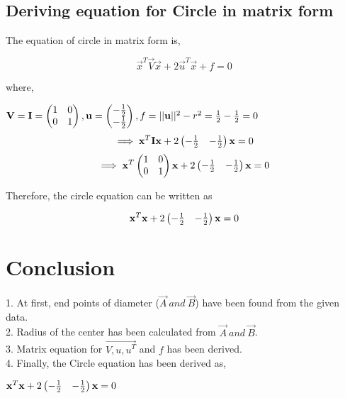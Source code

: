 \documentclass[journal,10pt,twocolumn]{article}
\begin{document}
\subsection{Deriving equation for Circle in matrix form}
\vspace{0.2cm}
\begin{flushleft}
The equation of circle in matrix form is,\\
\vspace{0.25cm}
\end{flushleft}
\vspace{0.25cm}
\begin{equation}
 \vec{x}^T \vec{V} \vec{x} + 2 \vec{u}^T \vec{x} + f = 0
\end{equation}
\endcenter

\begin{flushleft}
where,\\
\end{flushleft}
\center
$\mathbf{V} = \mathbf{I}= \begin{pmatrix} 1 & 0\\ 0 & 1\end{pmatrix}, \mathbf{u} = \begin{pmatrix}-\frac{1}{2} \\ -\frac{1}{2}\end{pmatrix}, f = ||\mathbf{u}||^2 - r^2 =\frac{1}{2}-\frac{1}{2}=0$\\
\endcenter
\begin{equation}
\implies \mathbf{x}^T\mathbf{I}\mathbf{x}  + 2  \begin{pmatrix}-\frac{1}{2}&-\frac{1}{2}\end{pmatrix} \mathbf{x} = 0
\end{equation}
\begin{equation}
   \implies  \mathbf{x}^T\begin{pmatrix}1&0\\0&1\end{pmatrix} \mathbf{x}  + 2  \begin{pmatrix}-\frac{1}{2}&-\frac{1}{2}\end{pmatrix} \mathbf{x}= 0 
\end{equation}
 \begin{flushleft}
\vspace{0.23cm}
Therefore, the circle equation can be written as
\end{flushleft}
\begin{equation}
    \mathbf{x}^T \mathbf{x} + 2 \begin{pmatrix}-\frac{1}{2}&-\frac{1}{2}\end{pmatrix} \mathbf{x}= 0
\end{equation}
\endcenter


\section{Conclusion}
\begin{flushleft}
1. At first, end points of diameter ($\vec{A}\ and\ \vec{B}$) have been found from the given data.\\
\vspace{0.25cm}
2. Radius of the center has been calculated from $\vec{A}\ and\ \vec{B}$.\\
\vspace{0.25cm}
3. Matrix equation for $\vec{V, u, u^T}$ and $f$ has been derived.\\
\vspace{0.25cm}
4. Finally, the Circle equation has been derived as, \\
\end{flushleft}

\begin{center}
    $\mathbf{x}^T \mathbf{x} + 2 \begin{pmatrix}-\frac{1}{2}&-\frac{1}{2}\end{pmatrix} \mathbf{x}= 0$
\end{center}
\end{document}
